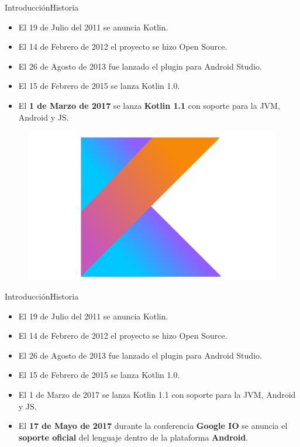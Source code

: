 \begin{frame}{Introducción}{Historia}
 \begin{itemize}
  \item El 19 de Julio del 2011 se anuncia Kotlin.
  \item El 14 de Febrero de 2012 el proyecto se hizo Open Source.
  \item El 26 de Agosto de 2013 fue lanzado el plugin para Android Studio.
  \item El 15 de Febrero de 2015 se lanza Kotlin 1.0.
  \item El \textbf{1 de Marzo de 2017} se lanza \textbf{Kotlin 1.1} con soporte para la JVM, Android y JS.
 \end{itemize}
 \begin{figure}[!htb]
    \endminipage
    \includegraphics[width=\linewidth]{images/introduction/kotlin_logo_2}
    \endminipage
    \endminipage
   \end{figure}
\end{frame}
\begin{frame}{Introducción}{Historia}
 \begin{itemize}
   \item El 19 de Julio del 2011 se anuncia Kotlin.
   \item El 14 de Febrero de 2012 el proyecto se hizo Open Source.
   \item El 26 de Agosto de 2013 fue lanzado el plugin para Android Studio.
   \item El 15 de Febrero de 2015 se lanza Kotlin 1.0.
  \item El 1 de Marzo de 2017 se lanza Kotlin 1.1 con soporte para la JVM, Android y JS.
  \item El \textbf{17 de Mayo de 2017} durante la conferencia \textbf{Google I\/O} se anuncia el \textbf{soporte oficial}
  del lenguaje dentro de la plataforma \textbf{Android}.
 \end{itemize}
\end{frame}

